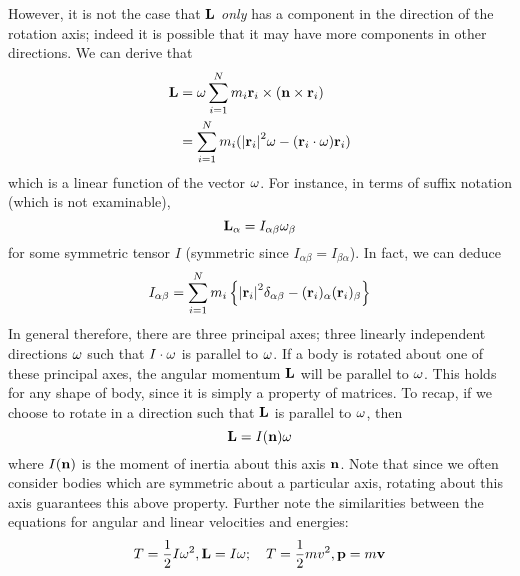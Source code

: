 However, it is not the case that \(\vb L\) \textit{only} has a component in the direction of the rotation axis; indeed it is possible that it may have more components in other directions.
We can derive that
\begin{align*}
	\vb L & = \omega \sum_{i=1}^N m_i \vb r_i \times (\vb n \times \vb r_i)                     \\
	      & = \sum_{i=1}^N m_i (\abs{\vb r_i}^2 \vb\omega - (\vb r_i \cdot \vb \omega) \vb r_i)
\end{align*}
which is a linear function of the vector \(\vb\omega\).
For instance, in terms of suffix notation (which is not examinable),
\[
	\vb L_\alpha = I_{\alpha\beta} \omega_\beta
\]
for some symmetric tensor \(I\) (symmetric since \(I_{\alpha\beta} = I_{\beta\alpha}\)).
In fact, we can deduce
\[
	I_{\alpha\beta} = \sum_{i=1}^N m_i \left\{ \abs{\vb r_i}^2 \delta_{\alpha\beta} - (\vb r_i)_\alpha (\vb r_i)_\beta \right\}
\]
In general therefore, there are three principal axes; three linearly independent directions \(\vb \omega\) such that \(I \cdot \vb \omega\) is parallel to \(\vb \omega\).
If a body is rotated about one of these principal axes, the angular momentum \(\vb L\) will be parallel to \(\vb\omega\).
This holds for any shape of body, since it is simply a property of matrices.
To recap, if we choose to rotate in a direction such that \(\vb L\) is parallel to \(\vb \omega\), then
\[
	\vb L = I(\vb n) \vb \omega
\]
where \(I(\vb n)\) is the moment of inertia about this axis \(\vb n\).
Note that since we often consider bodies which are symmetric about a particular axis, rotating about this axis guarantees this above property.
Further note the similarities between the equations for angular and linear velocities and energies:
\[
	T = \frac{1}{2}I\omega^2, \vb L = I\vb\omega;\quad T = \frac{1}{2}mv^2, \vb p = m\vb v
\]

